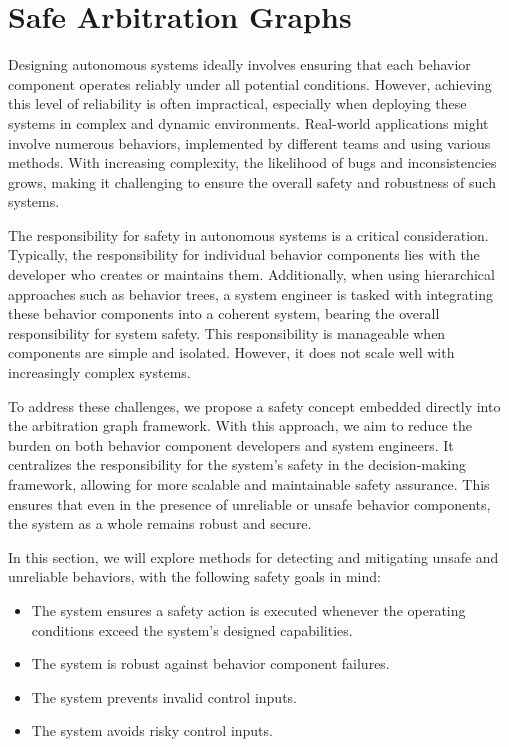 \section{Safe Arbitration Graphs}

Designing autonomous systems ideally involves ensuring that each behavior component operates reliably under all potential conditions.
However, achieving this level of reliability is often impractical, especially when deploying these systems in complex and dynamic environments.
Real-world applications might involve numerous behaviors, implemented by different teams and using various methods.
With increasing complexity, the likelihood of bugs and inconsistencies grows, making it challenging to ensure the overall safety and robustness of such systems.

The responsibility for safety in autonomous systems is a critical consideration.
Typically, the responsibility for individual behavior components lies with the developer who creates or maintains them.
Additionally, when using hierarchical approaches such as behavior trees,
    a system engineer is tasked with integrating these behavior components into a coherent system,
    bearing the overall responsibility for system safety.
This responsibility is manageable when components are simple and isolated.
However, it does not scale well with increasingly complex systems.

To address these challenges, we propose a safety concept embedded directly into the arbitration graph framework.
With this approach, we aim to reduce the burden on both behavior component developers and system engineers.
It centralizes the responsibility for the system's safety in the decision-making framework,
    allowing for more scalable and maintainable safety assurance.
This ensures that even in the presence of unreliable or unsafe behavior components, the system as a whole remains robust and secure.

In this section, we will explore methods for detecting and mitigating unsafe and unreliable behaviors, with the following safety goals in mind:

\begin{itemize}
    \item The system ensures a safety action is executed whenever the operating conditions exceed the system's designed capabilities.
    \item The system is robust against behavior component failures.
    \item The system prevents invalid control inputs.
    \item The system avoids risky control inputs.
\end{itemize}

